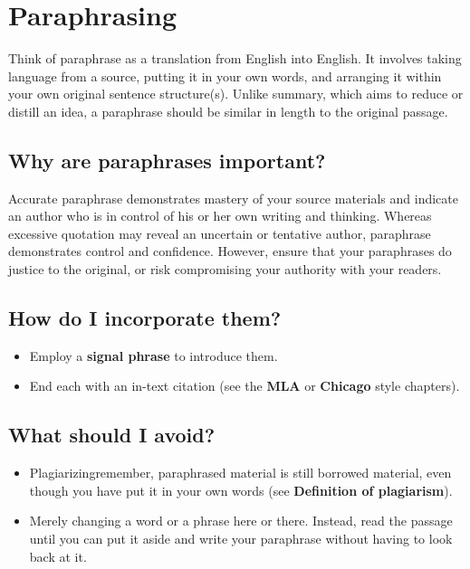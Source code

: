 \section{Paraphrasing}

Think of paraphrase as a translation from English into English. It involves taking 
language from a source, putting it in your own words, and arranging it within your own original 
sentence structure(s). Unlike summary, which aims to reduce or distill an idea, a paraphrase should 
be similar in length to the original passage.

\subsection{Why are paraphrases important?}

Accurate paraphrase demonstrates mastery of your source materials and indicate an author
who is in control of his or her own writing and thinking. Whereas excessive quotation may reveal
an uncertain or tentative author, paraphrase demonstrates control and confidence. However, 
ensure that your paraphrases do justice to the original, or risk compromising your authority
with your readers.

\subsection{How do I incorporate them?}

\begin{itemize}
\item Employ a \textbf{signal phrase} to introduce them.

\item End each with an in-text citation (see the \textbf{MLA} or \textbf{Chicago} style
chapters).

\end{itemize}

\subsection {What should I avoid?}

\begin{itemize}

\item Plagiarizing\textemdash remember, paraphrased material is still borrowed material, even 
though you have put it in your own words (see \textbf{Definition of plagiarism}).

\item Merely changing a word or a phrase here or there. Instead, read the passage until 
you can put it aside and write your paraphrase without having to look back at it.
\end{itemize}

